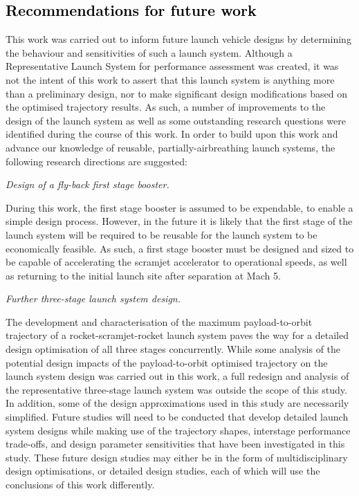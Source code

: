 \textcolor{black}{
  \chapter{Recommendations for future work}
}
\noindent  	
 This work was carried out to inform future launch vehicle designs by determining the behaviour and sensitivities of such a launch system. 
  Although a Representative Launch System for performance assessment was created, it was not the intent of this work to assert that this launch system is anything more than a preliminary design, nor to make significant design modifications based on the optimised trajectory results.
 As such, a number of improvements to the design of the launch system as well as some outstanding research questions were identified during the course of this work.
 In order to build upon this work and advance our knowledge of reusable, partially-airbreathing launch systems, the following research directions are suggested:


\vspace{10pt}
 \textit{Design of a fly-back first stage booster.}
 
 \noindent
 During this work, the first stage booster is assumed to be expendable, to enable a simple design process. However, in the future it is likely that the first stage of the launch system will be required to be reusable for the launch system to be economically feasible. As such, a first stage booster must be designed and sized to be capable of accelerating the scramjet accelerator to operational speeds, as well as returning to the initial launch site after separation at Mach 5. 

\vspace{10pt}
	\textit{Further three-stage launch system design.}

\noindent
The development and characterisation of the maximum payload-to-orbit trajectory of a rocket-scramjet-rocket launch system paves the way for a detailed design optimisation of all three stages concurrently.
While some analysis of the potential design impacts of the payload-to-orbit optimised trajectory on the launch system design was carried out in this work, a full redesign and analysis of the representative three-stage launch system was outside the scope of this study. In addition, some of the design approximations used in this study are necessarily simplified. Future studies will need to be conducted that develop detailed launch system designs while making use of the trajectory shapes, interstage performance trade-offs, and design parameter sensitivities that have been investigated in this study. These future design studies may either be in the form of multidisciplinary design optimisations, or detailed design studies, each of which will use the conclusions of this work differently. 

